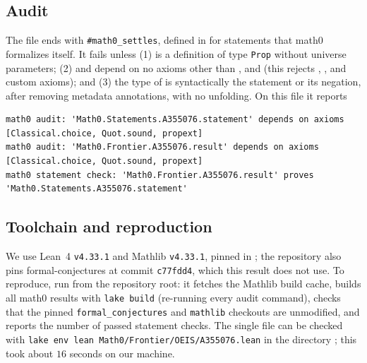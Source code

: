 \documentclass[11pt]{amsart}
\theoremstyle{plain}
\theoremstyle{definition}
\begin{document}
\subsection*{Audit}
The file ends with \texttt{\#math0\_settles}, defined in  for statements that math0 formalizes itself. It fails unless (1)  is a definition of type \texttt{Prop} without universe parameters; (2)  and  depend on no axioms other than ,  and  (this rejects , ,  and custom axioms); and (3) the type of  is syntactically the statement or its negation, after removing metadata annotations, with no unfolding. On this file it reports
\begin{lstlisting}
math0 audit: 'Math0.Statements.A355076.statement' depends on axioms [Classical.choice, Quot.sound, propext]
math0 audit: 'Math0.Frontier.A355076.result' depends on axioms [Classical.choice, Quot.sound, propext]
math0 statement check: 'Math0.Frontier.A355076.result' proves 'Math0.Statements.A355076.statement'
\end{lstlisting}

\subsection*{Toolchain and reproduction}
We use Lean~4 \cite{Lean4} \texttt{v4.33.1} and Mathlib \cite{Mathlib} \texttt{v4.33.1}, pinned in ; the repository also pins formal-conjectures \cite{FC} at commit \texttt{c77fdd4}, which this result does not use.
To reproduce, run  from the repository root: it fetches the Mathlib build cache, builds all math0 results with \texttt{lake build} (re-running every audit command), checks that the pinned \texttt{formal\_conjectures} and \texttt{mathlib} checkouts are unmodified, and reports the number of passed statement checks. The single file can be checked with \texttt{lake env lean Math0/Frontier/OEIS/A355076.lean} in the directory ; this took about $16$ seconds on our machine.
\end{document}

